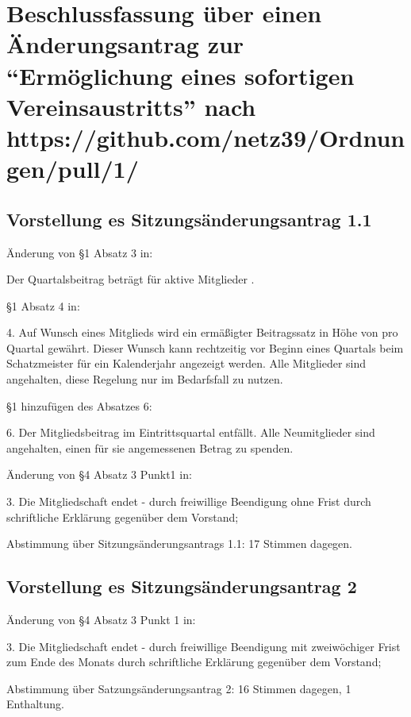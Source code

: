 \documentclass[a4paper,12pt,titlepage]{scrartcl}
\begin{document}
\section{Beschlussfassung über einen Änderungsantrag zur \enquote{Ermöglichung eines sofortigen Vereinsaustritts} nach https://github.com/netz39/Ordnungen/pull/1/}
\subsection{Vorstellung es Sitzungsänderungsantrag 1.1}

Änderung von §1 Absatz 3 in:
\begin{displayquote}
Der Quartalsbeitrag beträgt für aktive Mitglieder .
\end{displayquote}
§1 Absatz 4 in:
\begin{displayquote}
4. Auf Wunsch eines Mitglieds wird ein ermäßigter Beitragssatz in Höhe von  pro Quartal gewährt. Dieser Wunsch kann rechtzeitig vor Beginn eines Quartals beim Schatzmeister für ein Kalenderjahr angezeigt werden. Alle Mitglieder sind angehalten, diese Regelung nur im Bedarfsfall zu nutzen.
\end{displayquote}
§1 hinzufügen des Absatzes 6:
\begin{displayquote}
6. Der Mitgliedsbeitrag im Eintrittsquartal entfällt. Alle Neumitglieder sind angehalten, einen für sie angemessenen Betrag zu spenden.
\end{displayquote}
Änderung von §4  Absatz 3 Punkt1 in:
\begin{displayquote}
3. Die Mitgliedschaft endet - durch freiwillige Beendigung ohne Frist durch schriftliche Erklärung gegenüber dem Vorstand;
\end{displayquote}

Abstimmung über Sitzungsänderungsantrags 1.1: 17 Stimmen dagegen.

\subsection{Vorstellung es Sitzungsänderungsantrag 2}

Änderung von §4  Absatz 3 Punkt 1 in:
\begin{displayquote}
3. Die Mitgliedschaft endet
- durch freiwillige Beendigung mit zweiwöchiger Frist zum Ende des Monats durch schriftliche Erklärung gegenüber dem Vorstand;
\end{displayquote}
Abstimmung über Satzungsänderungsantrag 2: 16 Stimmen dagegen, 1 Enthaltung.
\end{document}
